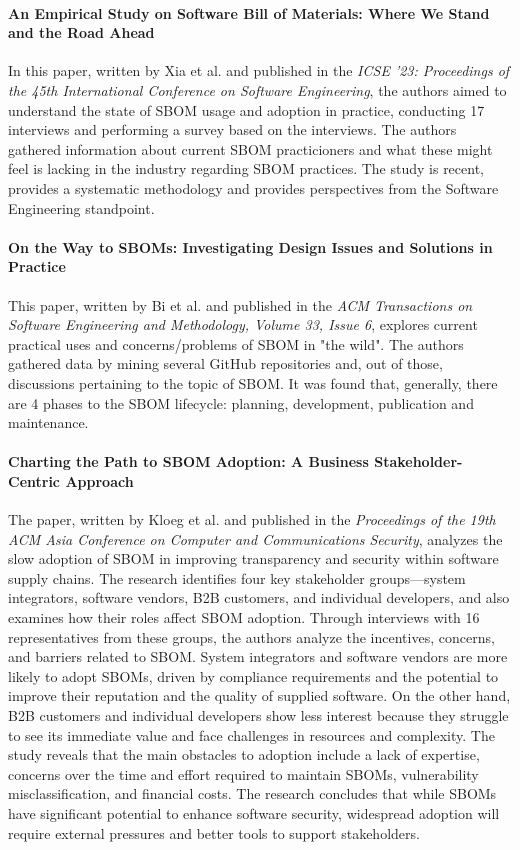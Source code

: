 \paragraph{An Empirical Study on Software Bill of Materials: Where We Stand and the Road Ahead} \cite{article:sbom-study} In this paper, written by Xia et al. and published in the \emph{ICSE '23: Proceedings of the 45th International Conference on Software Engineering}, the authors aimed to understand the state of SBOM usage and adoption in practice, conducting 17 interviews and performing a survey based on the interviews. The authors gathered information about current SBOM practicioners and what these might feel is lacking in the industry regarding SBOM practices. The study is recent, provides a systematic methodology and provides perspectives from the Software Engineering standpoint.

\paragraph{On the Way to SBOMs: Investigating Design Issues and Solutions in Practice} \cite{article:sboms-issues-solutions} This paper, written by Bi et al. and published in the \emph{ACM Transactions on Software Engineering and Methodology, Volume 33, Issue 6}, explores current practical uses and concerns/problems of SBOM in "the wild". The authors gathered data by mining several GitHub repositories and, out of those, discussions pertaining to the topic of SBOM. It was found that, generally, there are 4 phases to the SBOM lifecycle: planning, development, publication and maintenance.

\paragraph{Charting the Path to SBOM Adoption: A Business Stakeholder-Centric Approach} \cite{article:business-sbom} The paper, written by Kloeg et al. and published in the \emph{Proceedings of the 19th ACM Asia Conference on Computer and Communications Security}, analyzes the slow adoption of SBOM in improving transparency and security within software supply chains. The research identifies four key stakeholder groups—system integrators, software vendors, B2B customers, and individual developers, and also examines how their roles affect SBOM adoption. Through interviews with 16 representatives from these groups, the authors analyze the incentives, concerns, and barriers related to SBOM. System integrators and software vendors are more likely to adopt SBOMs, driven by compliance requirements and the potential to improve their reputation and the quality of supplied software. On the other hand, B2B customers and individual developers show less interest because they struggle to see its immediate value and face challenges in resources and complexity. The study reveals that the main obstacles to adoption include a lack of expertise, concerns over the time and effort required to maintain SBOMs, vulnerability misclassification, and financial costs. The research concludes that while SBOMs have significant potential to enhance software security, widespread adoption will require external pressures and better tools to support stakeholders.

